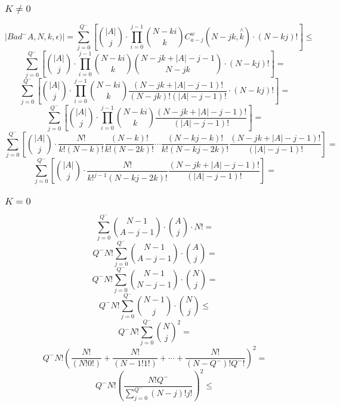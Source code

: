 \documentclass[10pt, a4paper]{article}
\theoremstyle{definition}
\begin{document}
\subsubsection{$K \neq 0$}
$$|Bad^-A,N,k,\epsilon)| = \sum_{j=0}^{Q^-} \left[ \binom{|A|}{j} \cdot \prod_{i=0}^{j-1} \binom{N - ki}{k} C^w_{a-j}(N-jk,\overset{\wedge}k) \cdot (N - kj)!\right] \leq$$
$$\sum_{j=0}^{Q^-} \left[ \binom{|A|}{j} \cdot \prod_{i=0}^{j-1} \binom{N - ki}{k} \binom{N-jk+|A| - j -1}{N-jk} \cdot (N - kj)!\right] =$$
$$\sum_{j=0}^{Q^-} \left[ \binom{|A|}{j} \cdot \prod_{i=0}^{j-1} \binom{N - ki}{k} \frac{(N-jk+|A| - j -1)!}{(N-jk)!(|A|-j-1)!} \cdot (N - kj)!\right] =$$
$$\sum_{j=0}^{Q^-} \left[ \binom{|A|}{j} \cdot \prod_{i=0}^{j-1} \binom{N - ki}{k} \frac{(N-jk+|A| - j -1)!}{(|A|-j-1)!}\right] =$$
$$\sum_{j=0}^{Q^-} \left[ \binom{|A|}{j} \cdot \frac{N!}{k!(N-k)!}\frac{(N-k)!}{k!(N-2k)!}\cdots\frac{(N-kj-k)!}{k!(N-kj-2k)!}  \frac{(N-jk+|A| - j -1)!}{(|A|-j-1)!}\right] =$$
$$\sum_{j=0}^{Q^-} \left[ \binom{|A|}{j} \cdot \frac{N!}{k!^{j-1}(N-kj-2k)!}  \frac{(N-jk+|A| - j -1)!}{(|A|-j-1)!}\right] =$$

\subsubsection{$K = 0$}
$$\sum_{j=0}^{Q^-} \binom{N-1}{A-j-1} \cdot \binom{A}{j} \cdot N! = $$
$$Q^-N!\sum_{j=0}^{Q^-} \binom{N-1}{A-j-1} \cdot \binom{A}{j} = $$
$$Q^-N!\sum_{j=0}^{Q^-} \binom{N-1}{N-j-1} \cdot \binom{N}{j} = $$
$$Q^-N!\sum_{j=0}^{Q^-} \binom{N-1}{j} \cdot \binom{N}{j} \leq $$
$$Q^-N!\sum_{j=0}^{Q^-} \binom{N}{j}^2 = $$
$$Q^-N! \left(\frac{N!}{(N!0!)} + \frac{N!}{(N-1!1!)} + \cdots + \frac{N!}{(N-Q^-)!Q^-!}\right)^2 = $$
$$Q^-N! \left(\frac{N!Q^-}{\sum_{j=0}^{Q^-} (N-j)!j!} \right)^2 \leq $$
\end{document}
